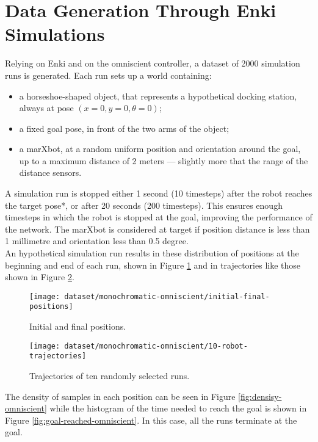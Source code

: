 \section{Data Generation Through Enki Simulations}
Relying on Enki and on the omniscient controller, a dataset of 2000 simulation 
runs is generated. 
Each run sets up a world containing:
\begin{itemize}
	\item a horseshoe-shaped object, that represents a hypothetical docking 
	station, always at pose $(x=0, y=0, \theta=0)$;
	\item a fixed goal pose, in front of the two arms of the object;
	\item a marXbot, at a random uniform position and orientation around the 
	goal, up to a maximum distance of 2 meters --- slightly more that the range 
	of the distance sensors.\\
\end{itemize}


A simulation run is stopped either 1 second (10 timesteps) after the robot 
reaches the target pose*, or after 20 seconds (200 timesteps). This ensures 
enough timesteps in which the robot is stopped at the goal, improving 
the performance of the network. The marXbot is considered at target if position 
distance is less than 1 millimetre and orientation less than 0.5 degree.
\\

An hypothetical simulation run results in these distribution of positions at 
the beginning and end of each run, shown 
in Figure \ref{fig:initial-final-positions-omniscient} and in trajectories like 
those shown in Figure 
\ref{fig:trajectories-omniscient}.

\begin{figure}[htbp]
\centerline{\texttt{[image: dataset/monochromatic-omniscient/initial-final-positions]}}
	\caption{Initial and final positions.}
	\label{fig:initial-final-positions-omniscient}
\end{figure}

\begin{figure}[htbp]
\centerline{\texttt{[image: dataset/monochromatic-omniscient/10-robot-trajectories]}}
	\caption{Trajectories of ten randomly selected runs.}
	\label{fig:trajectories-omniscient}
\end{figure}

The density of samples in each position can be seen in Figure 
\ref{fig:densisy-omniscient} while the histogram of the time needed to reach 
the goal is shown in Figure \ref{fig:goal-reached-omniscient}. In this case, 
all the runs terminate at the goal.\\

